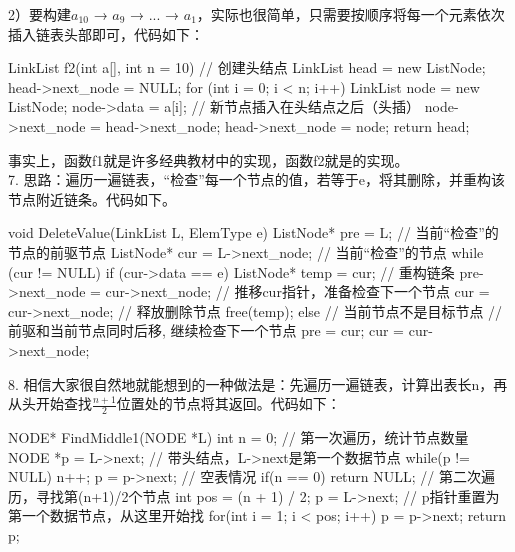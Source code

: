 \begin{exerciseanswer}
    2）要构建\(a_{10}\) → \(a_9\) → ... → \(a_1\)，实际也很简单，只需要按顺序将每一个元素依次插入链表头部即可，代码如下：
    \begin{cppcode}
        LinkList f2(int a[], int n = 10) {
            // 创建头结点
            LinkList head = new ListNode;
            head->next_node = NULL;
            for (int i = 0; i < n; i++) {
                LinkList node = new ListNode;
                node->data = a[i];
                // 新节点插入在头结点之后（头插）
                node->next_node = head->next_node;
                head->next_node = node;
            }
            return head;
        }
    \end{cppcode}
    事实上，函数f1就是许多经典教材中的实现，函数f2就是的实现。\\


7. 思路：遍历一遍链表，“检查”每一个节点的值，若等于e，将其删除，并重构该节点附近链条。代码如下。
\begin{cppcode}
    void DeleteValue(LinkList L, ElemType e) {
        ListNode* pre = L;          // 当前“检查”的节点的前驱节点
        ListNode* cur = L->next_node; // 当前“检查”的节点
        while (cur != NULL) {
            if (cur->data == e) {
                ListNode* temp = cur;
                // 重构链条
                pre->next_node = cur->next_node;
                // 推移cur指针，准备检查下一个节点
                cur = cur->next_node;
                // 释放删除节点
                free(temp);
            }
            else {
                // 当前节点不是目标节点
                // 前驱和当前节点同时后移, 继续检查下一个节点
                pre = cur;
                cur = cur->next_node;
            }
        }
    }
\end{cppcode}

8. 相信大家很自然地就能想到的一种做法是：先遍历一遍链表，计算出表长n，再从头开始查找\(\frac{n+1}{2}\)位置处的节点将其返回。代码如下：
\begin{cppcode}
    NODE* FindMiddle1(NODE *L) {
        int n = 0;
        // 第一次遍历，统计节点数量
        NODE *p = L->next;  // 带头结点，L->next是第一个数据节点
        while(p != NULL) {
            n++;
            p = p->next;
        }
        // 空表情况
        if(n == 0)
            return NULL;
        // 第二次遍历，寻找第(n+1)/2个节点
        int pos = (n + 1) / 2;
        p = L->next;    // p指针重置为第一个数据节点，从这里开始找
        for(int i = 1; i < pos; i++) {
            p = p->next;
        }
        return p;
    }
\end{cppcode}


\end{exerciseanswer}
